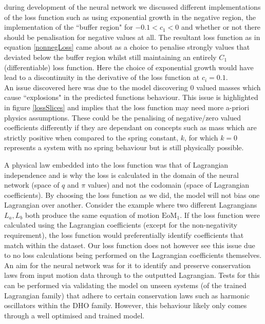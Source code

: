 \documentclass[10pt]{iopart}
\begin{document}
during development of the neural network we discussed different implementations of the loss function such as using exponential growth in the negative region, the implementation of the ``buffer region" for $-0.1 < c_1 < 0$ and whether or not there should be penalisation for negative values at all. The resultant loss function as in equation \ref{nonnegLoss} came about as a choice to penalise strongly values that deviated below the buffer region whilst still maintaining an entirely $C_1$ (differentiable) loss function. Here the choice of exponential growth would have lead to a discontinuity in the derivative of the loss function at $c_i = 0.1$. \\

An issue discovered here was due to the model discovering 0 valued masses which cause ``explosions" in the predicted functions behaviour. This issue is highlighted in figure \ref{lossSlices} and implies that the loss function may need more a-priori physics assumptions. These could be the penalising of negative/zero valued coefficients differently if they are dependant on concepts such as mass which are strictly positive when compared to the spring constant, $k$, for which $k=0$ represents a system with no spring behaviour but is still physically possible. 

A physical law embedded into the loss function was that of Lagrangian independence and is why the loss is calculated in the domain of the neural network (space of $q$ and $\pi$ values) and not the codomain (space of Lagrangian coefficients). By choosing the loss function as we did, the model will not bias one Lagrangian over another. Consider the example where two different Lagrangians $L_a, L_b$ both produce the same equation of motion $\textrm{EoM}_1$. If the loss function were calculated using the Lagrangian coefficients (except for the non-negativity requirement), the loss function would preferentially identify coefficients that match within the dataset. Our loss function does not however see this issue due to no loss calculations being performed on the Lagrangian coefficients themselves. \\

An aim for the neural network was for it to identify and preserve conservation laws from input motion data through to the outputted Lagrangian. Tests for this can be performed via validating the model on unseen systems (of the trained Lagrangian family) that adhere to certain conservation laws such as harmonic oscillators within the DHO family. However, this behaviour likely only comes through a well optimised and trained model.
\end{document}
